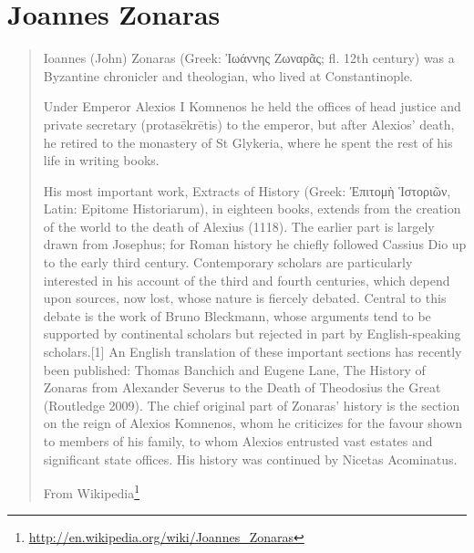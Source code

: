 \documentclass[12pt,letterpaper,twoside,final]{memoir}
\begin{document}
\section{Joannes Zonaras}
\blockquote[From Wikipedia\footnote{\url{http://en.wikipedia.org/wiki/Joannes_Zonaras}}]{

Ioannes (John) Zonaras (Greek: Ἰωάννης Ζωναρᾶς; fl. 12th century) was a Byzantine chronicler and theologian, who lived at Constantinople.

Under Emperor Alexios I Komnenos he held the offices of head justice and private secretary (protasēkrētis) to the emperor, but after Alexios' death, he retired to the monastery of St Glykeria, where he spent the rest of his life in writing books.

His most important work, Extracts of History (Greek: Ἐπιτομὴ Ἱστοριῶν, Latin: Epitome Historiarum), in eighteen books, extends from the creation of the world to the death of Alexius (1118). The earlier part is largely drawn from Josephus; for Roman history he chiefly followed Cassius Dio up to the early third century. Contemporary scholars are particularly interested in his account of the third and fourth centuries, which depend upon sources, now lost, whose nature is fiercely debated. Central to this debate is the work of Bruno Bleckmann, whose arguments tend to be supported by continental scholars but rejected in part by English-speaking scholars.[1] An English translation of these important sections has recently been published: Thomas Banchich and Eugene Lane, The History of Zonaras from Alexander Severus to the Death of Theodosius the Great (Routledge 2009). The chief original part of Zonaras' history is the section on the reign of Alexios Komnenos, whom he criticizes for the favour shown to members of his family, to whom Alexios entrusted vast estates and significant state offices. His history was continued by Nicetas Acominatus.}
\end{document}
